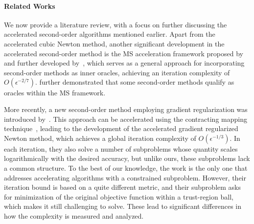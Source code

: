 \documentclass{article}
\begin{document}
\paragraph{Related Works}
We now provide a literature review, with a focus on further discussing the accelerated second-order algorithms mentioned earlier. Apart from the accelerated cubic Newton method, another significant development in the accelerated second-order method is the MS acceleration framework proposed by~\cite{monteiro2013accelerated} and further developed by~\citet{NEURIPS2022_e56f394b,carmon2022optimal}, which serves as a general approach for incorporating second-order methods as inner oracles, achieving an iteration complexity of $O(\epsilon^{-2/7})$. \citet{carmon2022optimal} further demonstrated that some second-order methods qualify as oracles within the MS framework.

More recently, a new second-order method employing gradient regularization was introduced by~\citet{mishchenko_regularized_2023}. This approach can be accelerated using the contracting mapping technique~\cite{doikov2020contracting}, leading to the development of the accelerated gradient regularized Newton method, which achieves a global iteration complexity of $O(\epsilon^{-1/3})$. In each iteration, they also solve a number of subproblems whose quantity scales logarithmically with the desired accuracy, but unlike ours, these subproblems lack a common structure. To the best of our knowledge, the work \cite{carmon2020acceleration} is the only one that addresses accelerating algorithms with a constrained subproblem. However, their iteration bound is based on a quite different metric, and their subproblem asks for minimization of the original objective function within a trust-region ball, which makes it still challenging to solve. These lead to significant differences in how the complexity is measured and analyzed.

\end{document}
